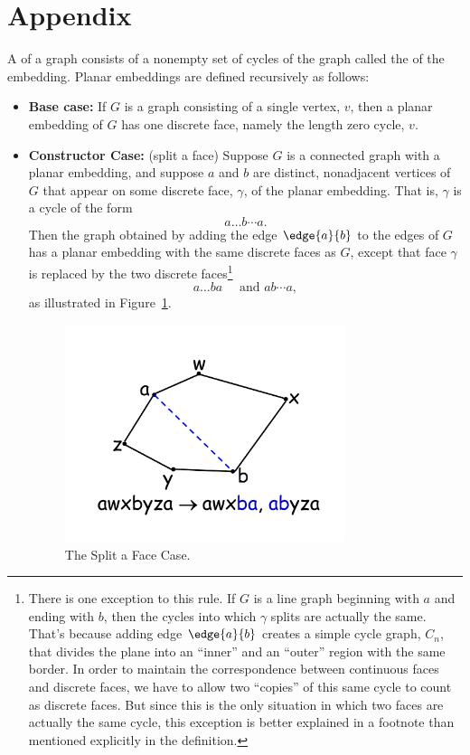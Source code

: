 \documentclass[handout]{mcs}
\begin{document}
\fi

\section*{Appendix}

\begin{definition}
  A  of a  graph consists of a
  nonempty set of cycles of the graph called the 
  of the embedding.  Planar embeddings are defined recursively as
  follows:

\begin{itemize}
\item \textbf{Base case:} If $G$ is a graph consisting of a single vertex,
$v$, then a planar embedding of $G$ has one discrete face, namely the
length zero cycle, $v$.

\item \textbf{Constructor Case:} (split a face) Suppose $G$ is a
connected graph with a planar embedding, and suppose $a$ and $b$ are
distinct, nonadjacent vertices of $G$ that appear on some discrete face,
$\gamma$, of the planar embedding.  That is, $\gamma$ is a cycle of the form
\[
a \dots b \cdots a.
\]
Then the graph obtained by adding the edge $\edge{a}{b}$ to the edges of
$G$ has a planar embedding with the same discrete faces as $G$, except
that face $\gamma$ is replaced by the two discrete
faces\footnote{\label{cp7f.C} There is one exception to this rule.  If $G$ is a
line graph beginning with $a$ and ending with $b$, then the cycles into
which $\gamma$ splits are actually the same.  That's because adding edge
$\edge{a}{b}$ creates a simple cycle graph, $C_n$, that divides the plane
into an ``inner'' and an ``outer'' region with the same border.  In order
to maintain the correspondence between continuous faces and discrete
faces, we have to allow two ``copies'' of this same cycle to count as
discrete faces.  But since this is the only situation in which two faces
are actually the same cycle, this exception is better explained in a
footnote than mentioned explicitly in the definition.}
\[
a\dots ba\quad \text{ and } ab\cdots a, 
\]
as illustrated in Figure~\ref{cp7f.fig:face-splitting}.

\begin{figure}[h]
\centering \includegraphics[height=2.5in]{figures/split-a-face}
\caption{The Split a Face Case.}
\label{cp7f.fig:face-splitting}
\end{figure}


\end{itemize}
\end{definition}
\end{document}
